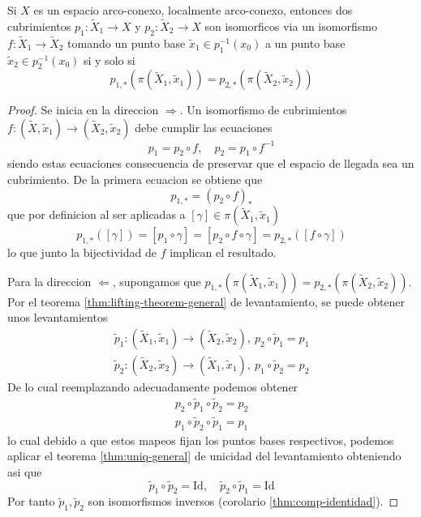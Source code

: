 \begin{teorema}\label{thm:exists-isomor}
  Si \(X\) es un espacio arco-conexo, localmente arco-conexo, entonces
  dos cubrimientos \(p_1 : \tilde X _1 \to X\) y \(p_2 : \tilde X _2 \to
  X\) son isomorficos via un isomorfismo \(f : \tilde X_1 \to \tilde
  X_2\) tomando un punto base \(\tilde x_1 \in p_1^{-1} (x_0)\) a un
  punto base \(\tilde x_2 \in p_2^{-1} (x_0)\) si y solo si
  \[ p_{1,*} \left( \pi (\tilde X _1, \tilde x _1) \right) = p_{2,*}
    \left( \pi (\tilde X _2, \tilde x _2) \right) \]
\end{teorema}
\begin{proof}
  Se inicia en la direccion \(\Rightarrow\). Un isomorfismo de cubrimientos
  \(f : (\tilde X , \tilde x _1) \to (\tilde X _2, \tilde x _2)\) debe
  cumplir las ecuaciones
  \[ p_1 = p_2 \circ f,\quad p_2 = p_1 \circ f^{-1} \]
  siendo estas ecuaciones consecuencia de preservar que el espacio de
  llegada sea un cubrimiento. De la primera ecuacion se obtiene que
  \[ p_{1,*} = \left( p_2 \circ f \right)_* \]
  que por definicion al ser aplicadas a \([\gamma] \in \pi (\tilde X_1,
  \tilde x_1)\)
  \begin{equation*}
      p_{1,*} \left( [\gamma] \right) = [p_1 \circ \gamma] = [p_2 \circ
      f \circ \gamma ] = p_{2,*} \left( [f \circ \gamma] \right)
  \end{equation*}
  lo que junto la bijectividad de \(f\) implican el resultado.

  Para la direccion \(\Leftarrow\), supongamos que \(p_{1,*} (\pi
  (\tilde X _1 , \tilde x _1)) = p_{2,*} (\pi
  (\tilde X _2 , \tilde x _2))\). Por el teorema
  \ref{thm:lifting-theorem-general} de levantamiento, se puede obtener
  unos levantamientos
  \begin{gather*}
    \tilde p _1 : (\tilde X _1 , \tilde x _1) \to (\tilde X_2 , \tilde
    x_2), \ p_2 \circ \tilde p_1 = p_1 \\
    \tilde p _2 : (\tilde X _2 , \tilde x _2) \to (\tilde X_1 , \tilde
    x_1), \ p_1 \circ \tilde p_2 = p_2
  \end{gather*}
  De lo cual reemplazando adecuadamente podemos obtener
  \begin{gather*}
    p_2 \circ \tilde p _1 \circ \tilde p _2 = p_2 \\
    p_1 \circ \tilde p _2 \circ \tilde p _1 = p_1
  \end{gather*}
  lo cual debido a que estos mapeos fijan los puntos bases respectivos,
  podemos aplicar el teorema \ref{thm:uniq-general} de unicidad
  del levantamiento obteniendo asi que
  \[ \tilde p_1 \circ \tilde p_2 = \text{Id}, \quad \tilde p_2 \circ
    \tilde p_1 = \text{Id} \]
  Por tanto \(\tilde p_1 , \tilde p_2\) son isomorfismos inversos
  (corolario \ref{thm:comp-identidad}).
\end{proof}

